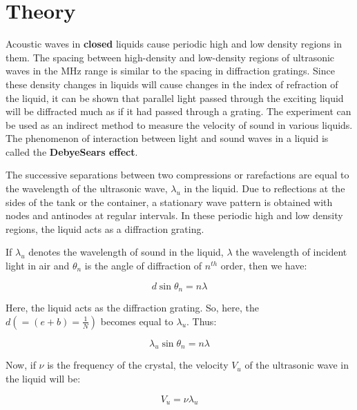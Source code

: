 \section{Theory}

	Acoustic waves in \textbf{closed} liquids cause periodic high and low density regions in them. The spacing between high-density and low-density regions of ultrasonic waves in the MHz range is similar to the spacing in diffraction gratings. Since these density changes in liquids will cause changes in the index of refraction of the liquid, it can be shown that parallel light passed through the exciting liquid will be diffracted much as if it had passed through a grating. The experiment can be used as an indirect method to measure the velocity of sound in various liquids. The phenomenon of interaction between light and sound waves in a liquid is called the \textbf{DebyeSears effect}.

	The successive separations between two compressions or rarefactions are equal to the wavelength of the ultrasonic wave, $\lambda_u$ in the liquid. Due to reflections at the sides of the tank or the container, a stationary wave pattern is obtained with nodes and antinodes at regular intervals. In these periodic high and low density regions, the liquid acts as a diffraction grating.

	If $\lambda_u$ denotes the wavelength of sound in the liquid, $\lambda$ the wavelength of incident light in air and $\theta_n$ is the angle of diffraction of $n^{th}$ order, then we have:

	$$d\sin\theta_n = n\lambda$$

	Here, the liquid acts as the diffraction grating. So, here, the $d (= (e+b) = \frac{1}{N})$ becomes equal to $\lambda_u$. Thus:

	$$\lambda_u\sin\theta_n = n\lambda$$

	Now, if $\nu$ is the frequency of the crystal, the velocity $V_u$ of the ultrasonic wave in the liquid will be:

	$$V_u = \nu\lambda_u$$